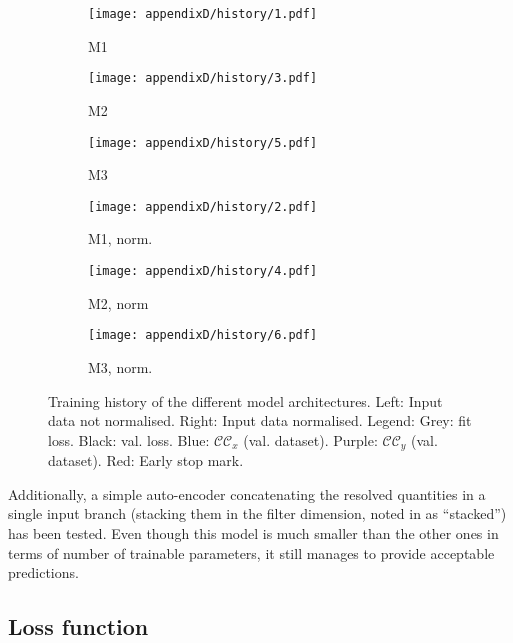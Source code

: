 \documentclass[../main.tex]{subfiles}
\begin{document}
\clearpage
\begin{figure*}[!ht]
\centering
\vspace{1cm}
\begin{multicols}{2}
	\begin{subfigure}[t]{\linewidth}		
		\texttt{[image: appendixD/history/1.pdf]}%
		\caption{M1}
	\end{subfigure}\vspace{0.3cm}
	\begin{subfigure}[t]{\linewidth}		
		\texttt{[image: appendixD/history/3.pdf]}%
		\caption{M2}
	\end{subfigure}\vspace{0.3cm}
	\begin{subfigure}[t]{\linewidth}
		\texttt{[image: appendixD/history/5.pdf]}
		\caption{M3}
	\end{subfigure}
		\begin{subfigure}[t]{\linewidth}		
		\texttt{[image: appendixD/history/2.pdf]}%
		\caption{M1, norm.}
	\end{subfigure}\vspace{0.3cm}
		\begin{subfigure}[t]{\linewidth}		
		\texttt{[image: appendixD/history/4.pdf]}%
		\caption{M2, norm}
	\end{subfigure}\vspace{0.3cm}
	\begin{subfigure}[t]{\linewidth}		
		\texttt{[image: appendixD/history/6.pdf]}%
		\caption{M3, norm.}
	\end{subfigure}
\end{multicols}
	\caption{Training history of the different model architectures.
Left: Input data not normalised.
Right: Input data normalised.
Legend: Grey: fit loss.
Black: val. loss.
Blue: $\mathcal{CC}_x$ (val. dataset).
Purple: $\mathcal{CC}_y$ (val. dataset).
Red: Early stop mark.} 
	\label{fig:models_convergence}
\end{figure*}

\clearpage
Additionally, a simple auto-encoder concatenating the resolved quantities in a single input branch (stacking them in the filter dimension, noted in  as ``stacked'') has been tested.
Even though this model is much smaller than the other ones in terms of number of trainable parameters, it still manages to provide acceptable predictions.

\subsection{Loss function}
\end{document}
